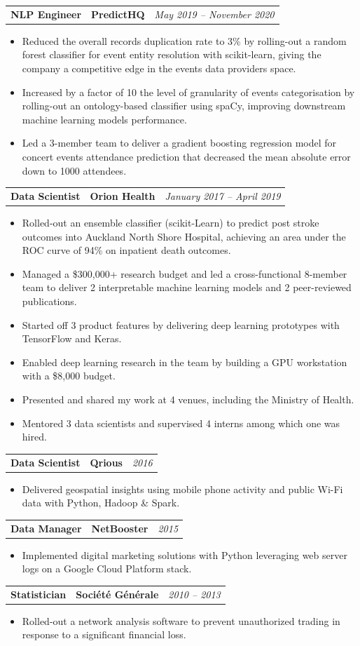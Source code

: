 \documentclass[letterpaper,11pt]{article}
\newcommand{\resumeItem}[1]{
  \item\small{#1 \vspace{-6pt}}
}
\newcommand{\resumeItemListStart}{\begin{itemize}[label=$\circ$, topsep=0.2cm, leftmargin=0.6cm]}
\newcommand{\resumeItemListEnd}{\end{itemize}\vspace{8pt}}
\newcommand{\job}[4]{
    \begin{tabular}{p{7cm}p{6cm}p{5cm}}
      \hspace{-0.7em} \textbf{#1} & \textbf{\small{#2}} & \hfill \textit{\small{#4}}
    \end{tabular}
}
\begin{document}
	\job {NLP Engineer}{PredictHQ}{Auckland}{May 2019 -- November 2020}
      \resumeItemListStart
          \resumeItem {Reduced the overall records duplication rate to 3\% by rolling-out a random forest classifier for event entity resolution with scikit-learn, giving the company a competitive edge in the events data providers space.}
          \resumeItem {Increased by a factor of 10 the level of granularity of events categorisation by rolling-out an ontology-based classifier using spaCy, improving downstream machine learning models performance.}
          \resumeItem {Led a 3-member team to deliver a gradient boosting regression model for concert events attendance prediction that decreased the mean absolute error down to 1000 attendees.}
        \resumeItemListEnd	
	
    \job {Data Scientist}{Orion Health}{Auckland}{January 2017 -- April 2019}
      \resumeItemListStart
        \resumeItem {Rolled-out an ensemble classifier (scikit-Learn) to predict post stroke outcomes into Auckland North Shore Hospital, achieving an area under the ROC curve of 94\% on inpatient death outcomes.}
        \resumeItem {Managed a \$300,000+ research budget and led a cross-functional 8-member team to deliver 2 interpretable machine learning models and 2 peer-reviewed publications.}
        \resumeItem {Started off 3 product features by delivering deep learning prototypes with TensorFlow and Keras.}
        \resumeItem {Enabled deep learning research in the team by building a GPU workstation with a \$8,000 budget.}
        \resumeItem {Presented and shared my work at 4 venues, including the Ministry of Health.}
        \resumeItem {Mentored 3 data scientists and supervised 4 interns among which one was hired.}
      \resumeItemListEnd

    \job {Data Scientist}{Qrious}{Auckland}{2016}
      \resumeItemListStart
        \resumeItem {Delivered geospatial insights using mobile phone activity and public Wi-Fi data with Python, Hadoop \& Spark.}
      \resumeItemListEnd

    \job {Data Manager}{NetBooster}{Paris}{2015}
        \resumeItemListStart
          \resumeItem {Implemented digital marketing solutions with Python leveraging web server logs on a Google Cloud Platform stack.}
        \resumeItemListEnd

    \job {Statistician}{Société Générale}{Paris}{2010 -- 2013}
      \resumeItemListStart
        \resumeItem {Rolled-out a network analysis software to prevent unauthorized trading in response to a significant financial loss.}
      \resumeItemListEnd
\end{document}
